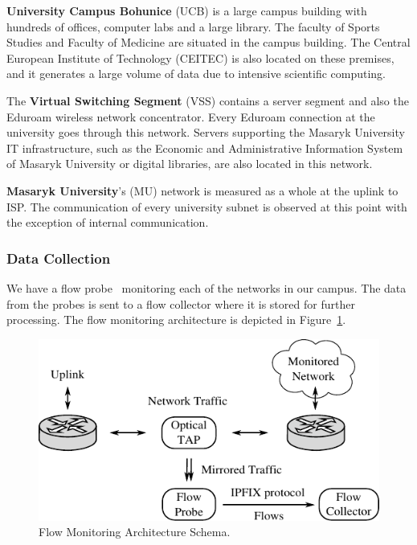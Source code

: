 \textbf{University Campus Bohunice} (UCB) is a large campus building with hundreds of offices, computer labs and a large library. The faculty of Sports Studies and Faculty of Medicine are situated in the campus building. The Central European Institute of Technology (CEITEC) is also located on these premises, and it generates a large volume of data due to intensive scientific computing.

The \textbf{Virtual Switching Segment} (VSS) contains a server segment and also the Eduroam wireless network concentrator. Every Eduroam connection at the university goes through this network. Servers supporting the Masaryk University IT infrastructure, such as the Economic and Administrative Information System of Masaryk University or digital libraries, are also located in this network.

\textbf{Masaryk University}'s (MU) network is measured as a whole at the uplink to ISP. The communication of every university subnet is observed at this point with the exception of internal communication.

\subsubsection{Data Collection}

We have a flow probe~\cite{Hofstede-2014-Flow} monitoring each of the networks in our campus. The data from the probes is sent to a flow collector where it is stored for further processing. The flow monitoring architecture is depicted in Figure~\ref{fig:characterization-monitoring-architecture}.

\begin{figure}[!t]
        \begin{center}
                \includegraphics{figures/paper-characterization/monitoring_architecture}
                \caption{Flow Monitoring Architecture Schema.}
                \label{fig:characterization-monitoring-architecture}
        \end{center}
\end{figure}

